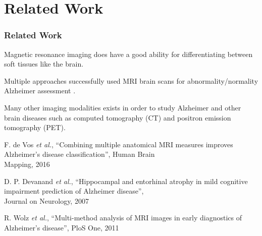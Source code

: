 \section{Related Work}

\begin{frame}
	\frametitle{Related Work}
	
	\Large
	
	\vspace{0.6cm}
	
	Magnetic resonance imaging does have a good ability for differentiating between soft tissues like
	the brain.
	
	\vspace{0.2cm}
	
	Multiple approaches successfully used MRI brain scans for abnormality/normality Alzheimer
	assessment \cite{DeVos16,Devanand07,Wolz11}.
	
	\vspace{0.2cm}
	
	Many other imaging modalities exists in order to study Alzheimer and other brain diseases such as
	computed tomography (CT) and positron emission tomography (PET).
	
	\vspace{0.2cm}
	
	\tiny
	
	\cite{DeVos16} F. de Vos \emph{et al.}, ``Combining multiple anatomical MRI measures improves
	Alzheimer's disease classification'', Human Brain\\ \hspace{0.25cm} Mapping, 2016
	
	\cite{Devanand07} D. P. Devanand \emph{et al.}, ``Hippocampal and entorhinal atrophy in mild
	cognitive impairment prediction of Alzheimer disease'',\\ \hspace{0.25cm} Journal on Neurology,
	2007
	
	\cite{Wolz11} R. Wolz \emph{et al.}, ``Multi-method analysis of MRI images in early diagnostics of
	Alzheimer's disease'', PloS One, 2011
\end{frame}

